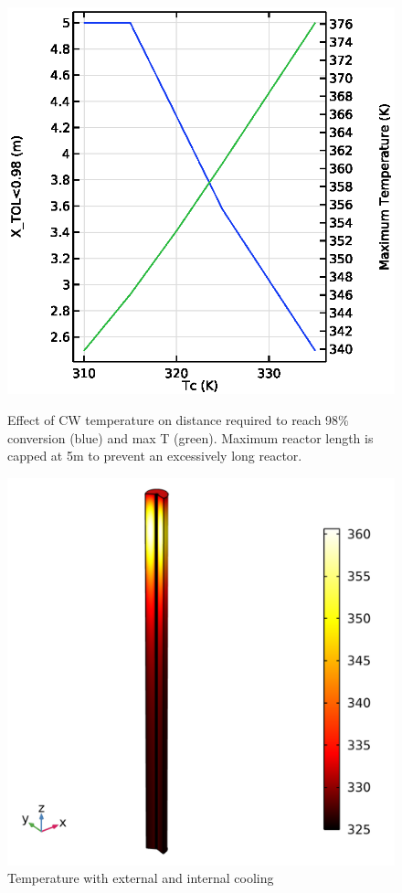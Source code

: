\begin{figure}[h]
    \begin{minipage}[t]{0.45\linewidth}
        \includegraphics[width=\linewidth]{figures/S4-CW-X-T.eps}
        \caption{Effect of CW temperature on distance required to reach 98\% conversion (blue) and max T (green). Maximum reactor length is capped at 5m to prevent an excessively long reactor.}
        \label{fig:comsol-S4-CW-X-T}
    \end{minipage}\hfill
    \begin{minipage}[t]{0.45\linewidth}
        \includegraphics[width=\linewidth]{figures/temperature-surface.png}
        \caption{Temperature with external and internal cooling}
        \label{fig:comsol-temperature:surface}
    \end{minipage}
\end{figure}

